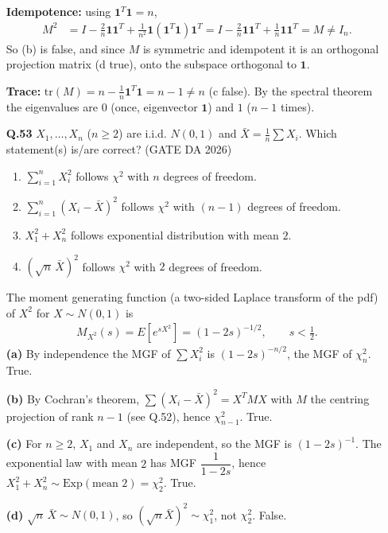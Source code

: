 \begin{enumerate}[label=\textbf{Q.\arabic*},leftmargin=*,start=1]
\textbf{Idempotence:} using $\mathbf 1^T\mathbf 1=n$,
\begin{align}
M^2&=I-\frac2n\mathbf{1}\mathbf{1}^T+\frac1{n^2}\mathbf{1}(\mathbf 1^T\mathbf 1)\mathbf{1}^T
=I-\frac2n\mathbf{1}\mathbf{1}^T+\frac1n\mathbf{1}\mathbf{1}^T=M\neq I_n .
\end{align}
So (b) is false, and since $M$ is symmetric and idempotent it is an orthogonal projection
matrix (d true), onto the subspace orthogonal to $\mathbf 1$.

\textbf{Trace:} $\mathrm{tr}(M)=n-\frac1n\mathbf 1^T\mathbf 1=n-1\neq n$ (c false). By the spectral theorem the
eigenvalues are $0$ (once, eigenvector $\mathbf 1$) and $1$ ($n-1$ times).

\item[\textbf{Q.53}] $X_1,\dots,X_n$ ($n\ge2$) are i.i.d. $N(0,1)$ and
$\bar X=\frac1n\sum X_i$. Which statement(s) is/are correct?
\hfill (GATE DA 2026)
\begin{enumerate}[label=(\alph*),itemsep=0pt]
 \item $\sum_{i=1}^nX_i^2$ follows $\chi^2$ with $n$ degrees of freedom.
 \item $\sum_{i=1}^n(X_i-\bar X)^2$ follows $\chi^2$ with $(n-1)$ degrees of freedom.
 \item $X_1^2+X_n^2$ follows exponential distribution with mean $2$.
 \item $(\sqrt n\,\bar X)^2$ follows $\chi^2$ with $2$ degrees of freedom.
\end{enumerate}
\solution
The moment generating function (a two-sided Laplace transform of the pdf) of $X^2$ for
$X\sim N(0,1)$ is
\begin{align}
M_{X^2}(s)=E\!\left[e^{sX^2}\right]=(1-2s)^{-1/2},\qquad s<\tfrac12 .
\end{align}
\textbf{(a)} By independence the MGF of $\sum X_i^2$ is $(1-2s)^{-n/2}$, the MGF of $\chi^2_n$. True.

\textbf{(b)} By Cochran's theorem, $\sum(X_i-\bar X)^2=X^T M X$ with $M$ the centring projection of rank
$n-1$ (see Q.52), hence $\chi^2_{n-1}$. True.

\textbf{(c)} For $n\ge 2$, $X_1$ and $X_n$ are independent, so the MGF is $(1-2s)^{-1}$. The exponential law
with mean $2$ has MGF $\dfrac{1}{1-2s}$, hence $X_1^2+X_n^2\sim\text{Exp}(\text{mean }2)=\chi^2_2$. True.

\textbf{(d)} $\sqrt n\,\bar X\sim N(0,1)$, so $(\sqrt n\bar X)^2\sim\chi^2_1$, not $\chi^2_2$. False.


\end{enumerate}
